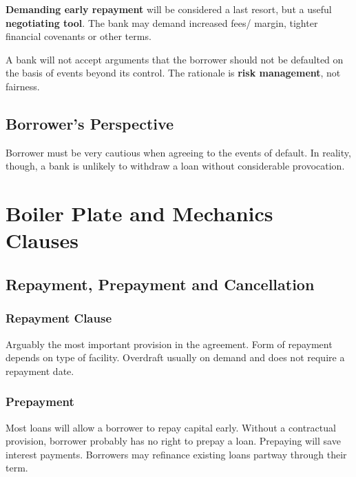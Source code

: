 \documentclass[
]{article}
\begin{document}
\textbf{Demanding early repayment} will be considered a last resort, but
a useful \textbf{negotiating tool}. The bank may demand increased fees/
margin, tighter financial covenants or other terms.

A bank will not accept arguments that the borrower should not be
defaulted on the basis of events beyond its control. The rationale is
\textbf{risk management}, not fairness.

\hypertarget{borrowers-perspective-2}{%
\subsection{Borrower's Perspective}\label{borrowers-perspective-2}}

Borrower must be very cautious when agreeing to the events of default.
In reality, though, a bank is unlikely to withdraw a loan without
considerable provocation.

\hypertarget{boiler-plate-and-mechanics-clauses}{%
\section{Boiler Plate and Mechanics
Clauses}\label{boiler-plate-and-mechanics-clauses}}

\hypertarget{repayment-prepayment-and-cancellation}{%
\subsection{Repayment, Prepayment and
Cancellation}\label{repayment-prepayment-and-cancellation}}

\hypertarget{repayment-clause}{%
\subsubsection{Repayment Clause}\label{repayment-clause}}

Arguably the most important provision in the agreement. Form of
repayment depends on type of facility. Overdraft usually on demand and
does not require a repayment date.

\hypertarget{prepayment}{%
\subsubsection{Prepayment}\label{prepayment}}

Most loans will allow a borrower to repay capital early. Without a
contractual provision, borrower probably has no right to prepay a loan.
Prepaying will save interest payments. Borrowers may refinance existing
loans partway through their term.
\end{document}
